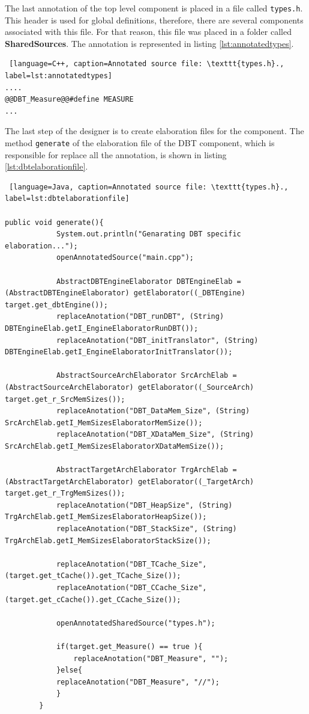 The last annotation of the top level component is placed in a file called \texttt{types.h}. This header is used for global definitions, therefore, there are several components associated with this file. For that reason, this file was placed in a folder called \textbf{SharedSources}. The annotation is represented in listing \ref{lst:annotatedtypes}.

\begin{lstlisting} [language=C++, caption=Annotated source file: \texttt{types.h}., label=lst:annotatedtypes]
....
@@DBT_Measure@@#define MEASURE
...
\end{lstlisting}

The last step of the designer is to create elaboration files for the component. The method \texttt{generate} of the elaboration file of the DBT component,  which is responsible for replace all the annotation, is shown in listing \ref{lst:dbtelaborationfile}.

\begin{lstlisting} [language=Java, caption=Annotated source file: \texttt{types.h}., label=lst:dbtelaborationfile]

public void generate(){
			System.out.println("Genarating DBT specific elaboration...");
			openAnnotatedSource("main.cpp");   
		
			AbstractDBTEngineElaborator DBTEngineElab = (AbstractDBTEngineElaborator) getElaborator((_DBTEngine) target.get_dbtEngine());
			replaceAnotation("DBT_runDBT", (String) DBTEngineElab.getI_EngineElaboratorRunDBT());
			replaceAnotation("DBT_initTranslator", (String) DBTEngineElab.getI_EngineElaboratorInitTranslator());
		
			AbstractSourceArchElaborator SrcArchElab = (AbstractSourceArchElaborator) getElaborator((_SourceArch) target.get_r_SrcMemSizes());
			replaceAnotation("DBT_DataMem_Size", (String) SrcArchElab.getI_MemSizesElaboratorMemSize());
			replaceAnotation("DBT_XDataMem_Size", (String) SrcArchElab.getI_MemSizesElaboratorXDataMemSize());
		
			AbstractTargetArchElaborator TrgArchElab = (AbstractTargetArchElaborator) getElaborator((_TargetArch) target.get_r_TrgMemSizes());
			replaceAnotation("DBT_HeapSize", (String) TrgArchElab.getI_MemSizesElaboratorHeapSize());
			replaceAnotation("DBT_StackSize", (String) TrgArchElab.getI_MemSizesElaboratorStackSize());
		
			replaceAnotation("DBT_TCache_Size",(target.get_tCache()).get_TCache_Size());
			replaceAnotation("DBT_CCache_Size",(target.get_cCache()).get_CCache_Size());
		
			openAnnotatedSharedSource("types.h");
		
			if(target.get_Measure() == true ){
				replaceAnotation("DBT_Measure", "");
			}else{
			replaceAnotation("DBT_Measure", "//");
			}
		}
     
\end{lstlisting}


